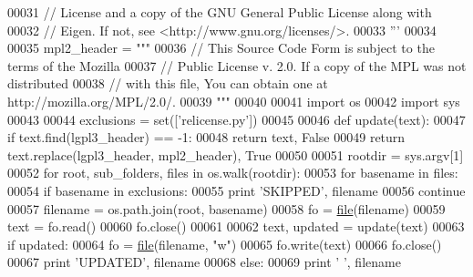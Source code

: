 \begin{DoxyCode}
00031 \textcolor{stringliteral}{// License and a copy of the GNU General Public License along with}
00032 \textcolor{stringliteral}{// Eigen. If not, see <http://www.gnu.org/licenses/>.}
00033 \textcolor{stringliteral}{'''}
00034 
00035 mpl2\_header = \textcolor{stringliteral}{"""}
00036 \textcolor{stringliteral}{// This Source Code Form is subject to the terms of the Mozilla}
00037 \textcolor{stringliteral}{// Public License v. 2.0. If a copy of the MPL was not distributed}
00038 \textcolor{stringliteral}{// with this file, You can obtain one at http://mozilla.org/MPL/2.0/.}
00039 \textcolor{stringliteral}{"""}
00040 
00041 \textcolor{keyword}{import} os
00042 \textcolor{keyword}{import} sys
00043 
00044 exclusions = set([\textcolor{stringliteral}{'relicense.py'}])
00045 
00046 \textcolor{keyword}{def }update(text):
00047   \textcolor{keywordflow}{if} text.find(lgpl3\_header) == -1:
00048     \textcolor{keywordflow}{return} text, \textcolor{keyword}{False}
00049   \textcolor{keywordflow}{return} text.replace(lgpl3\_header, mpl2\_header), \textcolor{keyword}{True}
00050 
00051 rootdir = sys.argv[1]
00052 \textcolor{keywordflow}{for} root, sub\_folders, files \textcolor{keywordflow}{in} os.walk(rootdir):
00053     \textcolor{keywordflow}{for} basename \textcolor{keywordflow}{in} files:
00054         \textcolor{keywordflow}{if} basename \textcolor{keywordflow}{in} exclusions:
00055           \textcolor{keywordflow}{print} \textcolor{stringliteral}{'SKIPPED'}, filename
00056           \textcolor{keywordflow}{continue}
00057         filename = os.path.join(root, basename)
00058         fo = \hyperlink{structfile}{file}(filename)
00059         text = fo.read()
00060         fo.close()
00061 
00062         text, updated = update(text)
00063         \textcolor{keywordflow}{if} updated:
00064           fo = \hyperlink{structfile}{file}(filename, \textcolor{stringliteral}{"w"})
00065           fo.write(text)
00066           fo.close()
00067           \textcolor{keywordflow}{print} \textcolor{stringliteral}{'UPDATED'}, filename
00068         \textcolor{keywordflow}{else}:
00069           \textcolor{keywordflow}{print} \textcolor{stringliteral}{'       '}, filename
\end{DoxyCode}
